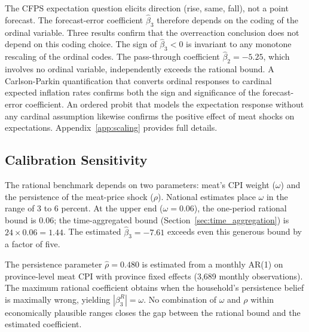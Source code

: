 The CFPS expectation question elicits direction (rise, same,
fall), not a point forecast.
The forecast-error coefficient $\hat{\beta}_3$ therefore
depends on the coding of the ordinal variable.
Three results confirm that the overreaction conclusion does
not depend on this coding choice.
The sign of $\hat{\beta}_3 < 0$ is invariant to any monotone
rescaling of the ordinal codes.
The pass-through coefficient $\hat{\beta}_2 = -5.25$, which
involves no ordinal variable, independently exceeds the
rational bound.
A Carlson-Parkin quantification that converts ordinal
responses to cardinal expected inflation rates confirms both
the sign and significance of the forecast-error coefficient.
An ordered probit that models the expectation response
without any cardinal assumption likewise confirms the positive
effect of meat shocks on expectations.
Appendix~\ref{app:scaling} provides full details.

\subsection{Calibration Sensitivity}\label{sec:calib_robust}

The rational benchmark depends on two parameters: meat's CPI
weight ($\omega$) and the persistence of the meat-price shock
($\rho$).
National estimates place $\omega$ in the range of 3 to 6
percent.
At the upper end ($\omega = 0.06$), the one-period rational
bound is 0.06; the time-aggregated bound
(Section~\ref{sec:time_aggregation}) is $24 \times 0.06 = 1.44$.
The estimated $\hat{\beta}_3 = -7.61$ exceeds even this
generous bound by a factor of five.

The persistence parameter $\hat{\rho} = 0.480$ is estimated
from a monthly AR(1) on province-level meat CPI with province
fixed effects (3,689 monthly observations).
The maximum rational coefficient obtains when the household's
persistence belief is maximally wrong, yielding
$|\beta_3^R| = \omega$.
No combination of $\omega$ and $\rho$ within economically
plausible ranges closes the gap between the rational bound
and the estimated coefficient.

